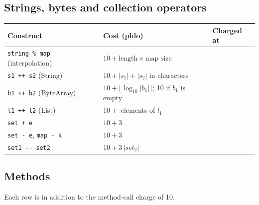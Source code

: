 \subsection{Strings, bytes and collection operators}

\begin{longtable}{@{}P{5.4cm}P{5.6cm}P{3.6cm}@{}}
\toprule
\textbf{Construct} & \textbf{Cost (phlo)} & \textbf{Charged at} \\
\midrule
\endhead
\texttt{string \% map} (interpolation) & $10 + \text{length} \times \text{map size}$ &  \\
\texttt{s1 ++ s2} (String) & $10 + |s_1| + |s_2|$ in characters &  \\
\texttt{b1 ++ b2} (ByteArray) & $10 + \lfloor \log_{10} |b_1| \rfloor$; 10 if $b_1$ is empty &  \\
\texttt{l1 ++ l2} (List) & $10 + $ elements of $l_1$ &  \\
\texttt{set + e} & $10 + 3$ &  \\
\texttt{set - e}, \texttt{map - k} & $10 + 3$ &  \\
\texttt{set1 -{}- set2} & $10 + 3\,|set_2|$ &  \\
\bottomrule
\end{longtable}

\subsection{Methods}

Each row is in addition to the method-call charge of 10.

